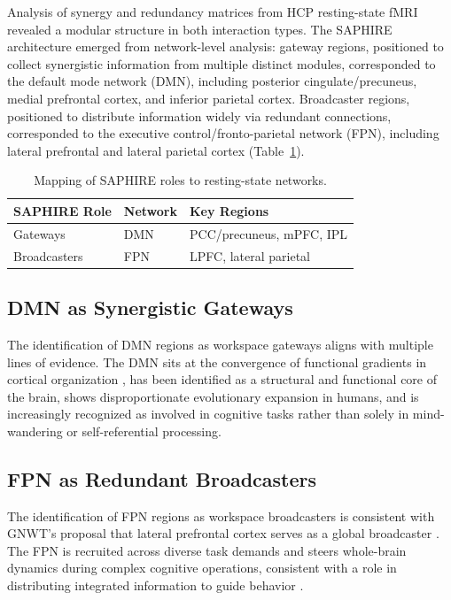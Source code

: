 \documentclass[11pt]{article}
\begin{document}
Analysis of synergy and redundancy matrices from HCP resting-state fMRI revealed a modular structure in both interaction types. The SAPHIRE architecture emerged from network-level analysis: gateway regions, positioned to collect synergistic information from multiple distinct modules, corresponded to the default mode network (DMN), including posterior cingulate/precuneus, medial prefrontal cortex, and inferior parietal cortex. Broadcaster regions, positioned to distribute information widely via redundant connections, corresponded to the executive control/fronto-parietal network (FPN), including lateral prefrontal and lateral parietal cortex (Table~\ref{tab:mapping}).

\begin{table}[htbp]
\centering
\caption{Mapping of SAPHIRE roles to resting-state networks.}
\label{tab:mapping}
\begin{tabular}{lll}
\toprule
SAPHIRE Role & Network & Key Regions \\
\midrule
Gateways & DMN & PCC/precuneus, mPFC, IPL \\
Broadcasters & FPN & LPFC, lateral parietal \\
\bottomrule
\end{tabular}
\end{table}

\subsection{DMN as Synergistic Gateways}

The identification of DMN regions as workspace gateways aligns with multiple lines of evidence. The DMN sits at the convergence of functional gradients in cortical organization \citep{margulies2016situating}, has been identified as a structural and functional core of the brain, shows disproportionate evolutionary expansion in humans, and is increasingly recognized as involved in cognitive tasks rather than solely in mind-wandering or self-referential processing.

\subsection{FPN as Redundant Broadcasters}

The identification of FPN regions as workspace broadcasters is consistent with GNWT's proposal that lateral prefrontal cortex serves as a global broadcaster \citep{dehaene2011experimental}. The FPN is recruited across diverse task demands and steers whole-brain dynamics during complex cognitive operations, consistent with a role in distributing integrated information to guide behavior \citep{cole2013multi}.
\end{document}
